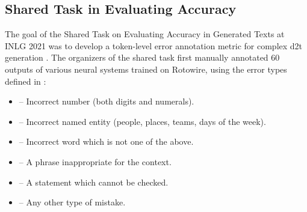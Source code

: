 \subsection{Shared Task in Evaluating Accuracy}
\label{sec:tok-acc:st}
The goal of the Shared Task on Evaluating Accuracy in Generated Texts at INLG 2021 was to develop a token-level error annotation metric for complex \ac{d2t} generation \cite{reiterSharedTaskEvaluating2020}. The organizers of the shared task first manually annotated 60 outputs of various neural systems trained on Rotowire, using the error types defined in \citet{thomsonGoldStandardMethodology2020}:
\begin{itemize}
    \item {} --  Incorrect number (both digits and numerals).
    \item {} -- Incorrect named entity (people, places, teams, days of the week).
    \item {} -- Incorrect word which is not one of the above.
    \item {} --  A phrase inappropriate for the context.
    \item {} --  A statement which cannot be checked.
    \item {} --  Any other type of mistake.
\end{itemize}
